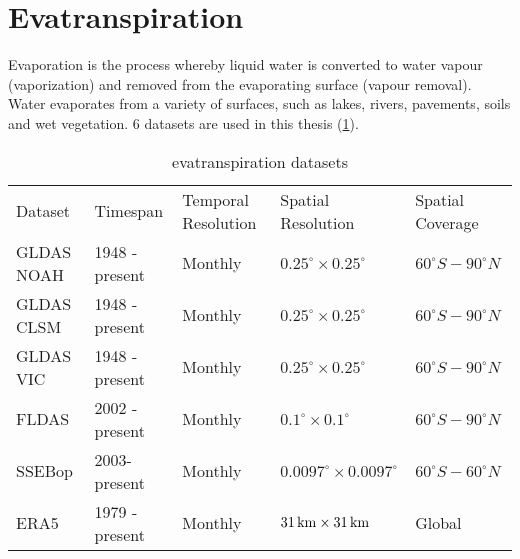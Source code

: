\section{Evatranspiration}
Evaporation is the process whereby liquid water is converted to water vapour (vaporization) and removed from the evaporating surface (vapour removal). Water evaporates from a variety of surfaces, such as lakes, rivers, pavements, soils and wet vegetation. 6 datasets are used in this thesis (\ref{tab:et}). 
\begin{table}[htbp]\centering 
	\begin{tabular}{lllll}
		&                                     &                                          &                                         &                                       \\ \hline
		\multicolumn{1}{|l|}{Dataset}    & \multicolumn{1}{l|}{Timespan}       & \multicolumn{1}{l|}{Temporal Resolution} & \multicolumn{1}{l|}{Spatial Resolution} & \multicolumn{1}{l|}{Spatial Coverage} \\ \hline
		\multicolumn{1}{|l|}{GLDAS NOAH} & \multicolumn{1}{l|}{1948 - present} & \multicolumn{1}{l|}{Monthly}             & \multicolumn{1}{l|}{$0.25^{\circ} \times  0.25^{\circ}$}        & \multicolumn{1}{l|}{$60^{\circ}S - 90^{\circ}N$}      \\ \hline
		\multicolumn{1}{|l|}{GLDAS CLSM} & \multicolumn{1}{l|}{1948 - present} & \multicolumn{1}{l|}{Monthly}             & \multicolumn{1}{l|}{$0.25^{\circ} \times 0.25^{\circ}$}        & \multicolumn{1}{l|}{$60^{\circ}S - 90^{\circ}N$}      \\ \hline
		\multicolumn{1}{|l|}{GLDAS VIC}  & \multicolumn{1}{l|}{1948 - present} & \multicolumn{1}{l|}{Monthly}             & \multicolumn{1}{l|}{$0.25^{\circ} \times 0.25^{\circ}$}        & \multicolumn{1}{l|}{$60^{\circ}S - 90^{\circ}N$}      \\ \hline
		\multicolumn{1}{|l|}{FLDAS}      & \multicolumn{1}{l|}{2002 - present} & \multicolumn{1}{l|}{Monthly}             & \multicolumn{1}{l|}{$0.1^{\circ} \times 0.1^{\circ}$}          & \multicolumn{1}{l|}{$60^{\circ}S - 90^{\circ}N$}      \\ \hline
		\multicolumn{1}{|l|}{SSEBop}     & \multicolumn{1}{l|}{2003- present}  & \multicolumn{1}{l|}{Monthly}             & \multicolumn{1}{l|}{$0.0097^{\circ} \times 0.0097^{\circ}$}    & \multicolumn{1}{l|}{$60^{\circ}S - 60^{\circ}N$}      \\ \hline
		\multicolumn{1}{|l|}{ERA5}       & \multicolumn{1}{l|}{1979 - present} & \multicolumn{1}{l|}{Monthly}             & \multicolumn{1}{l|}{$31\,\mathrm{km} \times 31\,\mathrm{km}$}            & \multicolumn{1}{l|}{Global}           \\ \hline
	\end{tabular}
	\caption{evatranspiration datasets}
	\label{tab:et}
\end{table}
